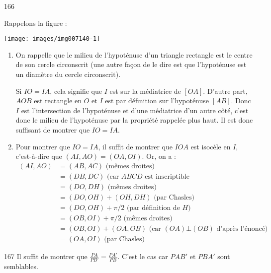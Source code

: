 \begin{Soln}{166}

Rappelons la figure :

\begin{center}
\texttt{[image: images/img007140-1]}
\end{center}

\begin{enumerate}
\item On rappelle que le milieu de l'hypoténuse d'un triangle rectangle est le centre de son cercle circonscrit (une autre façon de le dire est que l'hypoténuse est un diamètre du cercle circonscrit).

Si $IO=IA$, cela signifie que $I$ est sur la médiatrice de $[OA]$. D'autre part, $AOB$ est rectangle en $O$ et $I$ est par définition sur l'hypoténuse $[AB]$. Donc $I$ est  l'intersection de l'hypoténuse et d'une médiatrice d'un autre côté, c'est donc le milieu de l'hypoténuse par la propriété rappelée plus haut. Il est donc suffisant de montrer que $IO=IA$.


\item Pour montrer que $IO=IA$, il suffit de montrer que $IOA$ est isocèle en $I$, c'est-à-dire que $(AI,AO)=(OA,OI)$. Or, on a :
\begin{align*}
(AI,AO)& = (AB,AC) \text{ (mêmes droites)}\\
&= (DB,DC) \text{ (car $ABCD$ est inscriptible}\\
&= (DO,DH) \text{ (mêmes droites)}\\
&= (DO,OH)+(OH,DH) \text{ (par Chasles)}\\
&= (DO,OH)+\pi/2 \text{ (par définition de $H$)}\\
&= (OB,OI)+\pi/2 \text{ (mêmes droites)}\\
&= (OB,OI) + (OA,OB) \text{ (car $(OA)\bot (OB)$ d'après l'énoncé)}\\
&= (OA,OI) \text{ (par Chasles)}
\end{align*}
\end{enumerate}

\end{Soln}
\begin{Soln}{167}
Il suffit de montrer que $\frac{PA}{PB'} = \frac{PA'}{PB}$. C'est le cas car $PAB'$ et $PBA'$ sont semblables.
\end{Soln}
